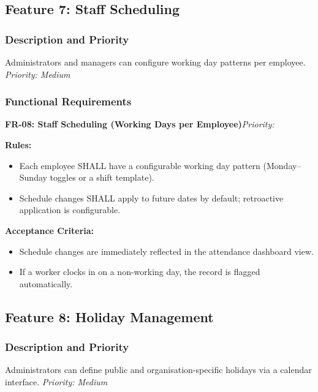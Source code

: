 \documentclass[12pt, a4paper]{article}
\newcommand{\frblock}[2]{%
    \noindent\textbf{#1}\hfill\textit{Priority: #2}%
    \par\smallskip%
}
\newcommand{\srsfield}[1]{\noindent\textbf{#1:}\par}
\begin{document}
\subsection{Feature 7: Staff Scheduling}

\subsubsection*{Description and Priority}
Administrators and managers can configure working day patterns per
employee.
\hfill \textit{Priority: Medium}

\subsubsection*{Functional Requirements}

\frblock{FR-08: Staff Scheduling (Working Days per Employee)}{}

\srsfield{Rules}
\begin{itemize}
    \item Each employee SHALL have a configurable working day pattern
          (Monday--Sunday toggles or a shift template).
    \item Schedule changes SHALL apply to future dates by default;
          retroactive application is configurable.
\end{itemize}

\srsfield{Acceptance Criteria}
\begin{itemize}
    \item Schedule changes are immediately reflected in the attendance
          dashboard view.
    \item If a worker clocks in on a non-working day, the record is
          flagged automatically.
\end{itemize}

\subsection{Feature 8: Holiday Management}

\subsubsection*{Description and Priority}
Administrators can define public and organisation-specific holidays via a
calendar interface.
\hfill \textit{Priority: Medium}
\end{document}
